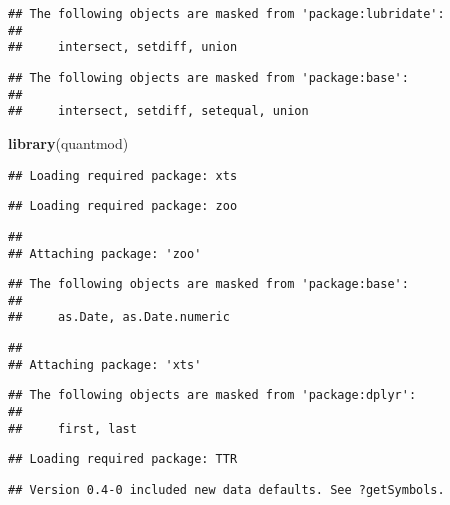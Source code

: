 \documentclass[]{article}
\newenvironment{Shaded}{\begin{snugshade}}{\end{snugshade}}
\newcommand{\KeywordTok}[1]{\textcolor[rgb]{0.13,0.29,0.53}{\textbf{#1}}}
\newcommand{\NormalTok}[1]{#1}
\begin{document}
\begin{verbatim}
## The following objects are masked from 'package:lubridate':
## 
##     intersect, setdiff, union
\end{verbatim}

\begin{verbatim}
## The following objects are masked from 'package:base':
## 
##     intersect, setdiff, setequal, union
\end{verbatim}

\begin{Shaded}
\begin{Highlighting}[]
\KeywordTok{library}\NormalTok{(quantmod)}
\end{Highlighting}
\end{Shaded}

\begin{verbatim}
## Loading required package: xts
\end{verbatim}

\begin{verbatim}
## Loading required package: zoo
\end{verbatim}

\begin{verbatim}
## 
## Attaching package: 'zoo'
\end{verbatim}

\begin{verbatim}
## The following objects are masked from 'package:base':
## 
##     as.Date, as.Date.numeric
\end{verbatim}

\begin{verbatim}
## 
## Attaching package: 'xts'
\end{verbatim}

\begin{verbatim}
## The following objects are masked from 'package:dplyr':
## 
##     first, last
\end{verbatim}

\begin{verbatim}
## Loading required package: TTR
\end{verbatim}

\begin{verbatim}
## Version 0.4-0 included new data defaults. See ?getSymbols.
\end{verbatim}
\end{document}
